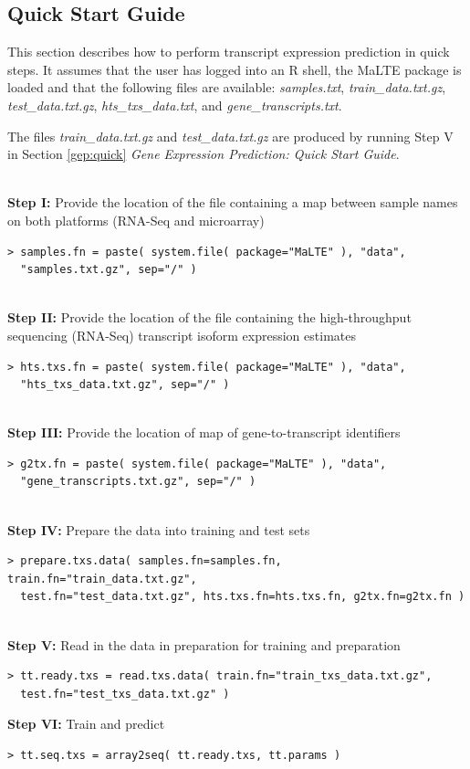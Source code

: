 \documentclass[a4paper,12pt]{article}
\begin{document}
\subsection{Quick Start Guide}
\label{tiep:quick}
This section describes how to perform transcript expression prediction in quick steps. It assumes that the user has logged into an \textsf{R} shell, the \textsf{MaLTE} package is loaded and that the following files are available: \textit{samples.txt}, \textit{train\_data.txt.gz}, \textit{test\_data.txt.gz}, \textit{hts\_txs\_data.txt}, and \textit{gene\_transcripts.txt}.

The files \textit{train\_data.txt.gz} and \textit{test\_data.txt.gz} are produced by running Step V in Section \ref{gep:quick} \textit{Gene Expression Prediction: Quick Start Guide}.

\noindent\\
\textbf{Step I:} Provide the location of the file containing a map between sample names on both platforms (RNA-Seq and microarray)
\begin{verbatim}
> samples.fn = paste( system.file( package="MaLTE" ), "data", 
  "samples.txt.gz", sep="/" )
\end{verbatim}

\noindent\\
\textbf{Step II:} Provide the location of the file containing the high-throughput sequencing (RNA-Seq) transcript isoform expression estimates
\begin{verbatim}
> hts.txs.fn = paste( system.file( package="MaLTE" ), "data", 
  "hts_txs_data.txt.gz", sep="/" )
\end{verbatim}

\noindent\\
\textbf{Step III:} Provide the location of map of gene-to-transcript identifiers
\begin{verbatim}
> g2tx.fn = paste( system.file( package="MaLTE" ), "data", 
  "gene_transcripts.txt.gz", sep="/" )
\end{verbatim}

\noindent\\
\textbf{Step IV:} Prepare the data into training and test sets
\begin{verbatim}
> prepare.txs.data( samples.fn=samples.fn, train.fn="train_data.txt.gz", 
  test.fn="test_data.txt.gz", hts.txs.fn=hts.txs.fn, g2tx.fn=g2tx.fn )
\end{verbatim}

\noindent\\
\textbf{Step V:} Read in the data in preparation for training and preparation
\begin{verbatim}
> tt.ready.txs = read.txs.data( train.fn="train_txs_data.txt.gz", 
  test.fn="test_txs_data.txt.gz" )
\end{verbatim}
\textbf{Step VI:} Train and predict
\begin{verbatim}
> tt.seq.txs = array2seq( tt.ready.txs, tt.params )
\end{verbatim}
\end{document}
